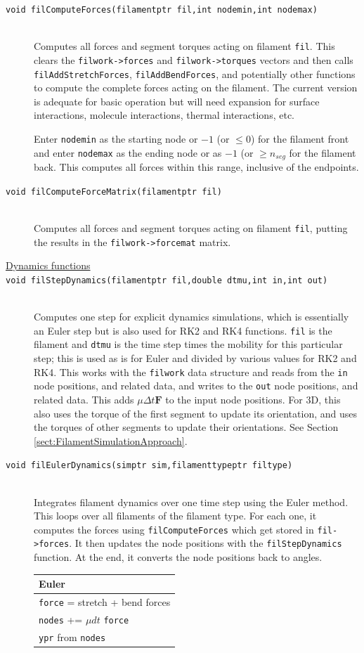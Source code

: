 \documentclass {scrbook}
\newcommand {\ttt} {\texttt}
\begin{document}
\begin{description}
\item[\ttt{void filComputeForces(filamentptr fil,int nodemin,int nodemax)}]
\hfill \\
Computes all forces and segment torques acting on filament \ttt{fil}. This clears the \ttt{filwork->forces} and \ttt{filwork->torques} vectors and then calls \ttt{filAddStretchForces}, \ttt{filAddBendForces}, and potentially other functions to compute the complete forces acting on the filament. The current version is adequate for basic operation but will need expansion for surface interactions, molecule interactions, thermal interactions, etc.

Enter \ttt{nodemin} as the starting node or $-1$ (or $\leq 0$) for the filament front and enter \ttt{nodemax} as the ending node or as $-1$ (or $\geq n_{seg}$ for the filament back. This computes all forces within this range, inclusive of the endpoints.


\item[\ttt{void filComputeForceMatrix(filamentptr fil)}]
\hfill \\
Computes all forces and segment torques acting on filament \ttt{fil}, putting the results in the \ttt{filwork->forcemat} matrix.


\item[\underline{Dynamics functions}]

\item[\ttt{void filStepDynamics(filamentptr fil,double dtmu,int in,int out)}]
\hfill \\
Computes one step for explicit dynamics simulations, which is essentially an Euler step but is also used for RK2 and RK4 functions. \ttt{fil} is the filament and \ttt{dtmu} is the time step times the mobility for this particular step; this is used as is for Euler and divided by various values for RK2 and RK4. This works with the \ttt{filwork} data structure and reads from the \ttt{in} node positions, and related data, and writes to the \ttt{out} node positions, and related data. This adds $\mu \Delta t \bm{F}$ to the input node positions. For 3D, this also uses the torque of the first segment to update its orientation, and uses the torques of other segments to update their orientations. See Section \ref{sect:FilamentSimulationApproach}.

\item[\ttt{void filEulerDynamics(simptr sim,filamenttypeptr filtype)}]
\hfill \\
Integrates filament dynamics over one time step using the Euler method. This loops over all filaments of the filament type. For each one, it computes the forces using \ttt{filComputeForces} which get stored in \ttt{fil->forces}. It then updates the node positions with the \ttt{filStepDynamics} function. At the end, it converts the node positions back to angles.
\begin{longtable}[c]{l}
Euler \\
\hline
\ttt{force} = stretch + bend forces \\
\ttt{nodes} += $\mu dt $ \ttt{force} \\
\ttt{ypr} from \ttt{nodes}
\end{longtable}


\end{description}
\end{document}
